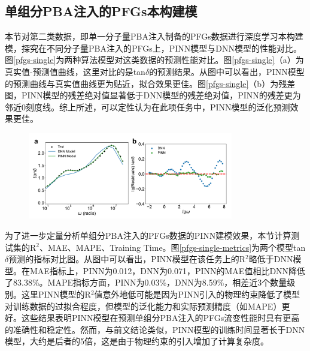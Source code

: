 \subsection{单组分PBA注入的PFGs本构建模}
本节对第二类数据，即单一分子量PBA注入制备的PFGs数据进行深度学习本构建模，探究在不同分子量PBA注入的PFGs上，PINN模型与DNN模型的性能对比。图\ref{pfgs-single}为两种算法模型对这类数据的预测性能对比。图\ref{pfgs-single}（a）为真实值-预测值曲线，这里对比的是tan$\delta$的预测结果。从图中可以看出，PINN模型的预测曲线与真实值曲线更为贴近，拟合效果更佳。图\ref{pfgs-single}（b）为残差图，PINN模型的残差绝对值显著低于DNN模型的残差绝对值，PINN的残差更为邻近0刻度线。综上所述，可以定性认为在此项任务中，PINN模型的泛化预测效果更佳。
\begin{figure}[htbp]
  \centering
  \includegraphics[width=0.8\textwidth]{Fig/pfgs-single.pdf}
\end{figure}
为了进一步定量分析单组分PBA注入的PFGs数据的PINN建模效果，本节计算测试集的R$^2$、MAE、MAPE、Training Time。图\ref{pfgs-single-metrics}为两个模型tan$\delta$预测的指标对比图。从图中可以看出，PINN模型在该任务上的R$^2$略低于DNN模型。在MAE指标上，PINN为0.012，DNN为0.071，PINN的MAE值相比DNN降低了83.38\%。MAPE指标方面，PINN为0.03\%，DNN为8.59\%，相差近3个数量级别。这里PINN模型的R$^2$值意外地低可能是因为PINN引入的物理约束降低了模型对训练数据的过拟合程度，但模型的泛化能力和实际预测精度（如MAPE）更好。这些结果表明PINN模型在预测单组分PBA注入的PFGs流变性能时具有更高的准确性和稳定性。然而，与前文结论类似，PINN模型的训练时间显著长于DNN模型，大约是后者的5倍，这是由于物理约束的引入增加了计算复杂度。
